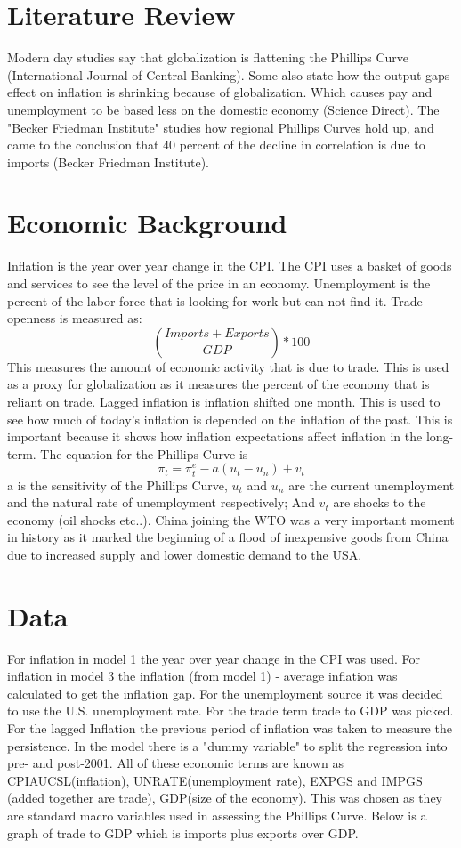 \documentclass{article}
\begin{document}
\section{Literature Review}

Modern day studies say that globalization is flattening the Phillips Curve (International Journal of Central Banking). Some also state how the output gaps effect on inflation is shrinking because of globalization. Which causes pay and unemployment to be based less on the domestic economy (Science Direct). The "Becker Friedman Institute" studies how regional Phillips Curves hold up, and came to the conclusion that 40 percent of the decline in correlation is due to imports (Becker Friedman Institute).

\section{Economic Background}

Inflation is the year over year change in the CPI. The CPI uses a basket of goods and services to see the level of the price in an economy. Unemployment is the percent of the labor force that is looking for work but can not find it. Trade openness is measured as:
$$(\frac{Imports+Exports}{GDP})*100$$
This measures the amount of economic activity that is due to trade. This is used as a proxy for globalization as it measures the percent of the economy that is reliant on trade. Lagged inflation is inflation shifted one month. This is used to see how much of today's inflation is depended on the inflation of the past. This is important because it shows how inflation expectations affect inflation in the long-term. The equation for the Phillips Curve is 
$$
\pi_t=\pi^e_t-a(u_t-u_n)+v_t
$$
a is the sensitivity of the Phillips Curve, $u_t$ and $u_n$ are the current unemployment and the natural rate of unemployment respectively; And $v_t$ are shocks to the economy (oil shocks etc..). China joining the WTO was a very important moment in history as it marked the beginning of a flood of inexpensive goods from China due to increased supply and lower domestic demand to the USA.
\section{Data}

For inflation in model 1 the year over year change in the CPI was used. For inflation in model 3 the inflation (from model 1) - average inflation was calculated to get the inflation gap. For the unemployment source it was decided to use the U.S. unemployment rate. For the trade term trade to GDP was picked. For the lagged Inflation the previous period of inflation was taken to measure the persistence. In the model there is a "dummy variable" to split the regression into pre- and post-2001. All of these economic terms are known as CPIAUCSL(inflation), UNRATE(unemployment rate), EXPGS and IMPGS (added together are trade), GDP(size of the economy). This was chosen as they are standard macro variables used in assessing the Phillips Curve. Below is a graph of trade to GDP which is imports plus exports over GDP.
\end{document}
